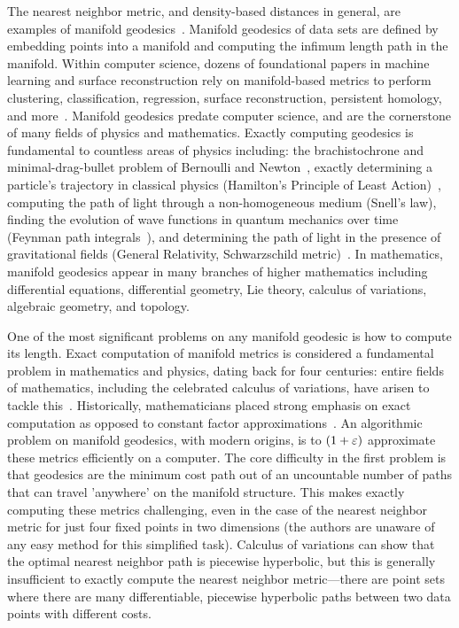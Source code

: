 The nearest neighbor metric, and density-based distances in general, are
examples of manifold geodesics~\cite{sajama05estimatingDBDM,
tenenbaum00global}.  Manifold geodesics of data sets are
defined by embedding points into a manifold and computing the infimum
length path in the manifold.  Within computer science, dozens of
foundational papers in machine learning and surface reconstruction rely on
manifold-based metrics to perform clustering, classification, regression,
surface reconstruction, persistent homology, and
more~\cite{sajama05estimatingDBDM}.  Manifold geodesics
predate computer science, and are the cornerstone of many fields of physics
and mathematics.  Exactly computing geodesics is fundamental to countless
areas of physics including: the brachistochrone and minimal-drag-bullet
problem of Bernoulli and Newton~\cite{bernoulli}, exactly determining a particle's
trajectory in classical physics (Hamilton's Principle of Least
Action)~\cite{Courant53}, computing the path of light through a
non-homogeneous medium (Snell's law), finding the evolution of wave
functions in quantum mechanics over time (Feynman path integrals~\cite{Feynman48}), and
determining the path of light in the presence of gravitational fields
(General Relativity, Schwarzschild metric)~\cite{Schwarzschild, Sussmann97}. In
mathematics, manifold geodesics appear in many branches of higher
mathematics including differential equations, differential geometry, Lie
theory, calculus of variations, algebraic geometry, and topology.

One of the most significant problems on any manifold geodesic is how to
compute its length.  Exact computation of manifold metrics is considered a
fundamental problem in mathematics and physics, dating back for four
centuries: entire fields of mathematics, including the celebrated calculus
of variations, have arisen to tackle this~\cite{Courant53}. Historically,
mathematicians placed strong emphasis on exact computation as opposed to
constant factor approximations~\cite{Courant53}. An algorithmic problem on manifold
geodesics, with modern origins, is to $(1+\varepsilon)$ approximate these metrics
efficiently on a computer.  The core difficulty in the first problem is
that geodesics are the minimum cost path out of an uncountable number of
paths that can travel 'anywhere' on the manifold structure.  This makes
exactly computing these metrics challenging, even in the case of the
nearest neighbor metric for just four fixed points in two dimensions (the
authors are unaware of any easy method for this simplified task).
Calculus of variations can show that the optimal nearest neighbor path is
piecewise hyperbolic, but this is generally insufficient to exactly compute
the nearest neighbor metric---there are point sets where there are
many differentiable, piecewise hyperbolic paths between two data points with
different costs.


